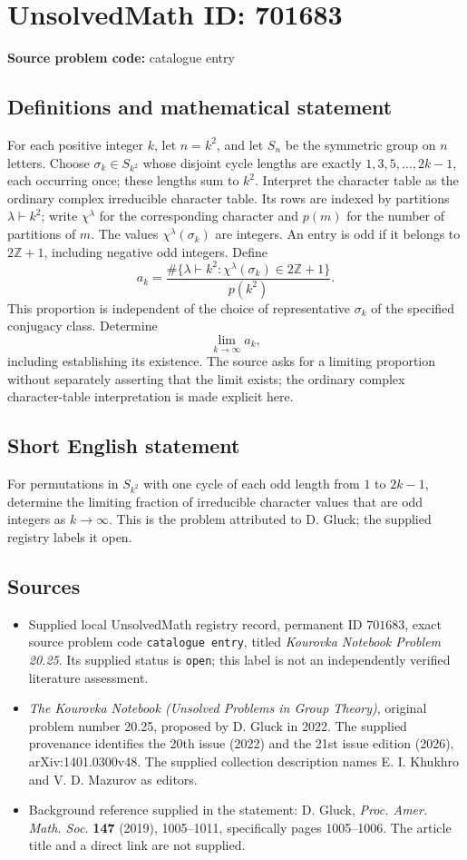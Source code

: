 \documentclass[11pt]{article}
\newcommand{\Z}{\mathbb{Z}}
\begin{document}
\section*{UnsolvedMath ID: 701683}
\textbf{Source problem code:} catalogue entry
\subsection{Definitions and mathematical statement}
For each positive integer \(k\), let \(n=k^2\), and let \(S_n\) be the symmetric group on \(n\) letters. Choose \(\sigma_k\in S_{k^2}\) whose disjoint cycle lengths are exactly \(1,3,5,\ldots,2k-1\), each occurring once; these lengths sum to \(k^2\). Interpret the character table as the ordinary complex irreducible character table. Its rows are indexed by partitions \(\lambda\vdash k^2\); write \(\chi^\lambda\) for the corresponding character and \(p(m)\) for the number of partitions of \(m\). The values \(\chi^\lambda(\sigma_k)\) are integers. An entry is odd if it belongs to \(2\Z+1\), including negative odd integers. Define
\[
 a_k=\frac{\#\{\lambda\vdash k^2:\chi^\lambda(\sigma_k)\in 2\Z+1\}}{p(k^2)}.
\]
This proportion is independent of the choice of representative \(\sigma_k\) of the specified conjugacy class. Determine
\[
\lim_{k\to\infty}a_k,
\]
including establishing its existence. The source asks for a limiting proportion without separately asserting that the limit exists; the ordinary complex character-table interpretation is made explicit here.
\subsection{Short English statement}
For permutations in \(S_{k^2}\) with one cycle of each odd length from \(1\) to \(2k-1\), determine the limiting fraction of irreducible character values that are odd integers as \(k\to\infty\). This is the problem attributed to D. Gluck; the supplied registry labels it open.
\subsection{Sources}
\begin{itemize}
\item Supplied local UnsolvedMath registry record, permanent ID \(701683\), exact source problem code \texttt{catalogue entry}, titled \emph{Kourovka Notebook Problem 20.25}. Its supplied status is \texttt{open}; this label is not an independently verified literature assessment.
\item \emph{The Kourovka Notebook (Unsolved Problems in Group Theory)}, original problem number 20.25, proposed by D. Gluck in 2022. The supplied provenance identifies the 20th issue (2022) and the 21st issue edition (2026), arXiv:1401.0300v48. The supplied collection description names E. I. Khukhro and V. D. Mazurov as editors.
\item Background reference supplied in the statement: D. Gluck, \emph{Proc. Amer. Math. Soc.} \textbf{147} (2019), 1005--1011, specifically pages 1005--1006. The article title and a direct link are not supplied.
\end{itemize}
\end{document}
